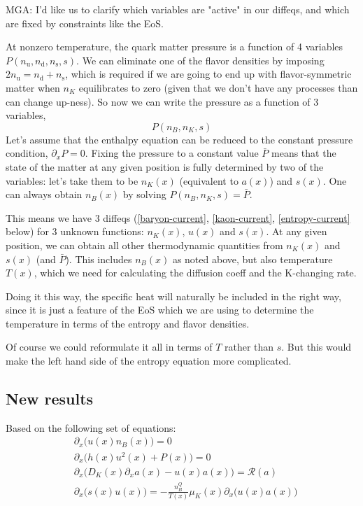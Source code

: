 \documentclass[11pt]{article}
\newcommand{\mga}[1]{{\color[rgb]{0.8,0,0}#1}}
\newcommand{\p}{\partial}
\begin{document}
\bigskip
\mga{
MGA: I'd like us to clarify which variables are "active" in our diffeqs, and which are fixed by constraints like the EoS.

\medskip\noindent
At nonzero temperature, the quark matter pressure is a function of 4 variables
$P(n_\text{u},n_\text{d},n_\text{s},s)$.
We can eliminate one of the flavor densities by imposing $2n_\text{u}=n_\text{d}+n_\text{s}$,
which is required if we are going to end up with flavor-symmetric matter when $n_K$ equilibrates to zero (given that we don't have any processes than can change up-ness).  So now we can write the pressure as a function of 3 variables,
\[
P(n_B,n_K,s)
\]
Let's assume that the enthalpy equation can be reduced to the constant pressure condition, $\p_x P=0$. Fixing the pressure to a constant value $\bar P$ means that the state of the matter at any given position is fully determined by two of the variables: let's take them to be $n_K(x)$ (equivalent to $a(x)$) and $s(x)$. One can always obtain $n_B(x)$ by solving $P(n_B,n_K,s)=\bar P$.

\medskip\noindent
This means we have 3 diffeqs (\eqref{baryon-current}, \eqref{kaon-current}, \eqref{entropy-current} below) for 3 unknown functions: $n_K(x)$, $u(x)$ and $s(x)$. At any given position, we can obtain all other thermodynamic quantities from $n_K(x)$ and $s(x)$ (and $\bar P$). This includes $n_B(x)$ as noted above, but also temperature $T(x)$, which we need for calculating the diffusion coeff and the K-changing rate.

\medskip\noindent
Doing it this way, the specific heat will naturally be included in the right way, since it is just a feature of the EoS which we are using to determine the temperature in terms of the entropy and flavor densities.

\medskip\noindent
Of course we could reformulate it all in terms of $T$ rather than $s$. But this would make the left hand side of the entropy equation more complicated.
}


\subsection{New results}

Based on the following set of equations:
\begin{align}
& \partial_x\Big(u(x) n_B(x)\Big) = 0 \label{baryon-current}\\
& \partial_x\Big( h(x)u^2(x) + P(x)\Big) = 0 \label{enthalpy-current}\\
& \partial_x\Big( D_K(x)\partial_x a(x) - u(x)a(x)\Big) = \mathcal{R}(a) \label{kaon-current}\\
& \partial_x\Big(s(x)u(x)\Big) = -\frac{n_B^Q}{T(x)}\mu_K(x)\partial_x\Big(u(x) a(x)\Big) \label{entropy-current}
\end{align}
\end{document}
